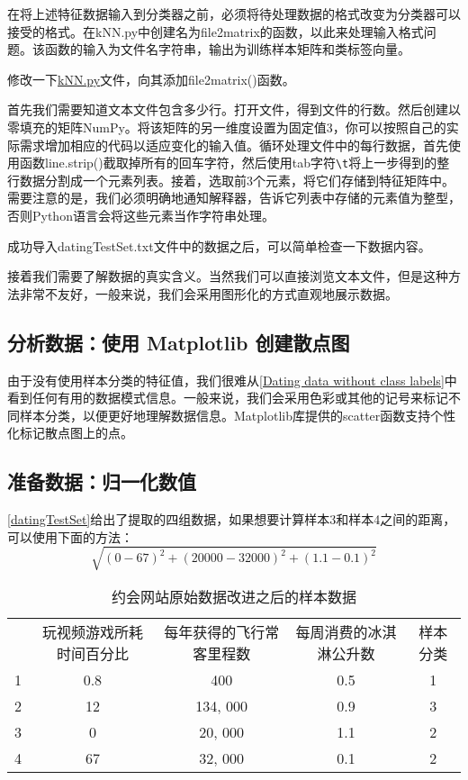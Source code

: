 在将上述特征数据输入到分类器之前，必须将待处理数据的格式改变为分类器可以接受的格式。在kNN.py中创建名为file2matrix的函数，以此来处理输入格式问题。该函数的输入为文件名字符串，输出为训练样本矩阵和类标签向量。

修改一下\href{}{kNN.py}文件，向其添加file2matrix()函数。

首先我们需要知道文本文件包含多少行。打开文件，得到文件的行数。然后创建以零填充的矩阵NumPy。将该矩阵的另一维度设置为固定值3，你可以按照自己的实际需求增加相应的代码以适应变化的输入值。循环处理文件中的每行数据，首先使用函数line.strip()截取掉所有的回车字符，然后使用tab字符\verb|\t|将上一步得到的整行数据分割成一个元素列表。接着，选取前3个元素，将它们存储到特征矩阵中。需要注意的是，我们必须明确地通知解释器，告诉它列表中存储的元素值为整型，否则Python语言会将这些元素当作字符串处理。

成功导入datingTestSet.txt文件中的数据之后，可以简单检查一下数据内容。

接着我们需要了解数据的真实含义。当然我们可以直接浏览文本文件，但是这种方法非常不友好，一般来说，我们会采用图形化的方式直观地展示数据。

\subsection{分析数据：使用 Matplotlib 创建散点图}

由于没有使用样本分类的特征值，我们很难从\autoref{Dating data without class labels}中看到任何有用的数据模式信息。一般来说，我们会采用色彩或其他的记号来标记不同样本分类，以便更好地理解数据信息。Matplotlib库提供的scatter函数支持个性化标记散点图上的点。

\subsection{准备数据：归一化数值}
\autoref{datingTestSet}给出了提取的四组数据，如果想要计算样本3和样本4之间的距离，可以使用下面的方法：
$$\sqrt{(0-67)^2 + (20000-32000)^2+(1.1-0.1)^2}$$
\begin{table}[H]
    \centering
    \caption{约会网站原始数据改进之后的样本数据}
    \label{datingTestSet}
    \begin{tabular}{ccccc}
        \hline
          & 玩视频游戏所耗时间百分比 & 每年获得的飞行常客里程数 & 每周消费的冰淇淋公升数 & 样本分类 \\
        1 & 0.8          & 400          & 0.5         & 1    \\
        2 & 12           & 134, 000     & 0.9         & 3    \\
        3 & 0            & 20, 000      & 1.1         & 2    \\
        4 & 67           & 32, 000      & 0.1         & 2    \\
        \hline
    \end{tabular}
\end{table}

